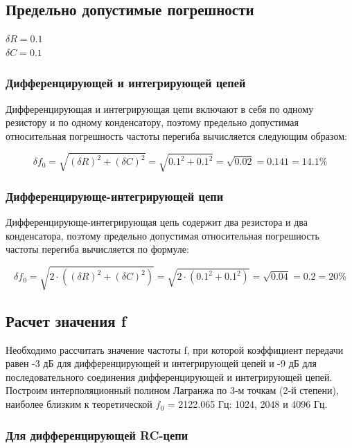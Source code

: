 \subsection{Предельно допустимые погрешности}
\begin{center}
$\delta R = 0.1$\\
$\delta C = 0.1$\\
\end{center}

\subsubsection{Дифференцирующей и интегрирующей цепей}

Дифференцирующая и интегрирующая цепи включают в себя по одному резистору и по одному конденсатору, поэтому предельно допустимая относительная погрешность частоты перегиба вычисляется следующим образом:

\begin{equation}
\delta f_0 = \sqrt{(\delta R)^2 + (\delta C)^2} = \sqrt{0.1^2 + 0.1^2} = \sqrt{0.02} = 0.141 = 14.1 \%
\end{equation}

\subsubsection{Дифференцирующе-интегрирующей цепи}

Дифференцирующе-интегрирующая цепь содержит два резистора и два конденсатора, поэтому предельно допустимая относительная погрешность частоты перегиба вычисляется по формуле:

\begin{equation}
\delta f_0 = \sqrt{2 \cdot ((\delta R)^2 + (\delta C)^2)} = \sqrt{2 \cdot (0.1^2 + 0.1^2)} = \sqrt{0.04} = 0.2 = 20 \%
\end{equation}

\subsection{Расчет значения f}
  Необходимо рассчитать значение частоты f, при которой коэффициент передачи равен -3 дБ для дифференцирующей и интегрирующей цепей и -9 дБ для последовательного соединения дифференцирующей и интегрирующей цепей. Построим интерполяционный полином Лагранжа по 3-м точкам (2-й степени), наиболее близким к теоретической $f_0$ = 2122.065 Гц: 1024, 2048 и 4096 Гц.
\subsubsection{Для дифференцирующей RC-цепи}

